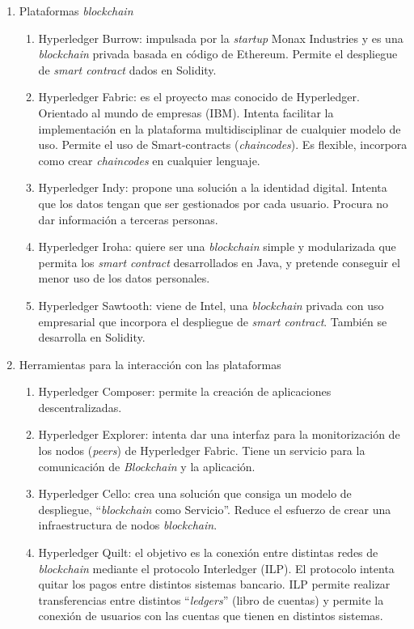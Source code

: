 \begin{enumerate}

	\item Plataformas \textit{blockchain}
	
	\begin{enumerate}[1)]
		\item Hyperledger Burrow: impulsada por la \textit{startup} Monax Industries y es una \textit{blockchain} privada basada en código de Ethereum. Permite el despliegue de \textit{smart contract} dados en Solidity.
	\item Hyperledger Fabric: es el proyecto mas conocido de Hyperledger. Orientado al mundo de empresas (IBM). Intenta facilitar la implementación en la plataforma multidisciplinar de cualquier modelo de uso. Permite el uso de Smart-contracts (\textit{chaincodes}). 
Es flexible, incorpora como crear \textit{chaincodes} en cualquier lenguaje.
	\item Hyperledger Indy: propone una solución a la identidad digital. Intenta que los datos tengan que ser gestionados por cada usuario. Procura no dar información a terceras personas.
	\item Hyperledger Iroha: quiere ser una \textit{blockchain} simple y modularizada que permita los \textit{smart contract} desarrollados en Java, y pretende conseguir el menor uso de los datos personales. 
	\item Hyperledger Sawtooth: viene de Intel, una \textit{blockchain} privada con uso empresarial que incorpora el despliegue de \textit{smart contract}. También se desarrolla en Solidity. 
\end{enumerate} 
	\item Herramientas para la interacción con las plataformas
	\begin{enumerate}[1)]
		\item Hyperledger Composer: permite la creación de aplicaciones descentralizadas.
		\item Hyperledger Explorer: intenta dar una interfaz para la monitorización de los nodos (\textit{peers}) de Hyperledger Fabric. Tiene un servicio para la comunicación de \textit{Blockchain} y la aplicación. 
		\item Hyperledger Cello: crea una solución que consiga un modelo de despliegue, ``\textit{blockchain} como Servicio''. Reduce el esfuerzo de crear una infraestructura de nodos \textit{blockchain}.
		\item Hyperledger Quilt: el objetivo es la conexión entre distintas redes de \textit{blockchain} mediante el protocolo Interledger (ILP). El protocolo intenta quitar los pagos entre distintos sistemas bancario. ILP permite realizar transferencias entre distintos “\textit{ledgers}” (libro de cuentas) y permite la conexión de usuarios con las cuentas que tienen en distintos sistemas.
	\end{enumerate}
\end{enumerate}


